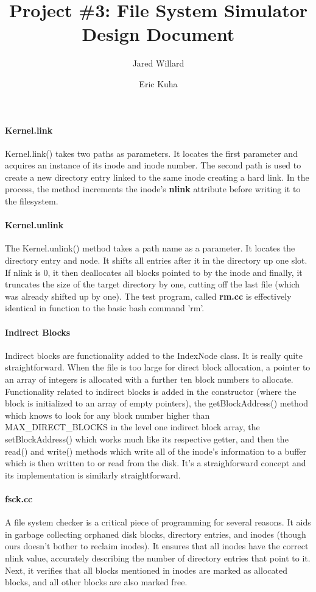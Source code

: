 \documentclass[12pt]{article}
\title{\large Project \#3: File System Simulator\\ \large Design Document}
\author{%
  Jared Willard
  \and  Eric Kuha}
\begin{document}
\maketitle

\paragraph{Kernel.link} 
\hfill \break
Kernel.link() takes two paths as parameters. It locates the first parameter and
acquires an instance of its inode and inode number. The second path is used to
create a new directory entry linked to the same inode creating a hard link. In
the process, the method increments the inode's \textbf{nlink} attribute before
writing it to the filesystem.

\paragraph{Kernel.unlink}
\hfill \break
The Kernel.unlink() method takes a path name as a parameter. It locates the
directory entry and node. It shifts all entries after it in the directory up
one slot. If nlink is 0, it then deallocates all blocks pointed to by the inode
and finally, it truncates the size of the target directory by one, cutting off
the last file (which was already shifted up by one). The test program, called
\textbf{rm.cc} is effectively identical in function to the basic bash command
'rm'.

\paragraph{Indirect Blocks}
\hfill \break
Indirect blocks are functionality added to the IndexNode class. It is really
quite straightforward. When the file is too large for direct block
allocation, a pointer to an array of integers is allocated with a further ten
block numbers to allocate. Functionality related to indirect blocks is added in
the constructor (where the block is initialized to an array of empty pointers),
the getBlockAddress() method which knows to look for any block number higher
than MAX\_DIRECT\_BLOCKS in the level one indirect block array, the
setBlockAddress() which works much like its respective getter, and then the
read() and write() methods which write all of the inode's information to a
buffer which is then written to or read from the disk. It's a straighforward
concept and its implementation is similarly straightforward.

\paragraph{fsck.cc}
\hfill \break
A file system checker is a critical piece of programming for several reasons.
It aids in garbage collecting orphaned disk blocks, directory entries, and
inodes (though ours doesn't bother to reclaim inodes). It ensures that all
inodes have the correct nlink value, accurately describing the number of
directory entries that point to it. Next, it verifies that all blocks mentioned
in inodes are marked as allocated blocks, and all other blocks are also marked
free.
\end{document}
